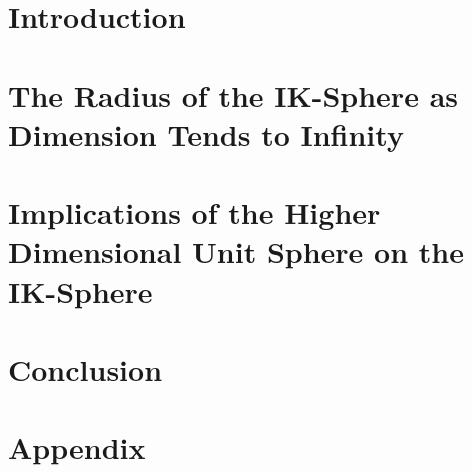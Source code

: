 \documentclass[a4paper, 12pt]{report}
\theoremstyle{definition}
\begin{document}
    
    
    
    \singlespacing
    
    \doublespacing
    
    
    \chapter{Introduction}
    
    
    \chapter{The Radius of the IK-Sphere as Dimension Tends to Infinity}
    
    
    \chapter{Implications of the Higher Dimensional Unit Sphere on the IK-Sphere}
    
    
    \chapter{Conclusion}
    
    
    \printbibliography
    
    \appendix
    \chapter{Appendix}
    
\end{document}
